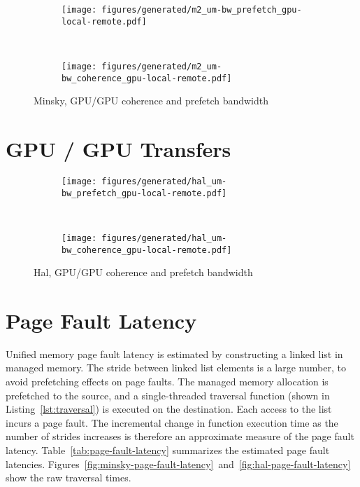 \begin{figure}[ht]
    \centering
    \begin{subfigure}[b]{0.45\textwidth}
        \texttt{[image: figures/generated/m2\_um-bw\_prefetch\_gpu-local-remote.pdf]}
        \caption{}
        \label{}
    \end{subfigure}
    ~
    \begin{subfigure}[b]{0.45\textwidth}
        \texttt{[image: figures/generated/m2\_um-bw\_coherence\_gpu-local-remote.pdf]}
        \caption{}
        \label{}
    \end{subfigure}
    \caption[]{
        Minsky, GPU/GPU coherence and prefetch bandwidth
    }
    \label{}
\end{figure}


\section{GPU / GPU Transfers}
\label{sec:um-gpu-gpu}


\begin{figure}[ht]
    \centering
    \begin{subfigure}[b]{0.45\textwidth}
        \texttt{[image: figures/generated/hal\_um-bw\_prefetch\_gpu-local-remote.pdf]}
        \caption{}
        \label{}
    \end{subfigure}
    ~
    \begin{subfigure}[b]{0.45\textwidth}
        \texttt{[image: figures/generated/hal\_um-bw\_coherence\_gpu-local-remote.pdf]}
        \caption{}
        \label{}
    \end{subfigure}
    \caption[]{Hal, GPU/GPU coherence and prefetch bandwidth}
    \label{}
\end{figure}


\section{Page Fault Latency}

Unified memory page fault latency is estimated by constructing a linked list in managed memory.
The stride between linked list elements is a large number, to avoid prefetching effects on page faults.
The managed memory allocation is prefetched to the source, and a single-threaded traversal function (shown in Listing~\ref{lst:traversal}) is executed on the destination.
Each access to the list incurs a page fault.
The incremental change in function execution time as the number of strides increases is therefore an approximate measure of the page fault latency.
Table~\ref{tab:page-fault-latency} summarizes the estimated page fault latencies.
Figures~\ref{fig:minsky-page-fault-latency}~and~\ref{fig:hal-page-fault-latency} show the raw traversal times.

